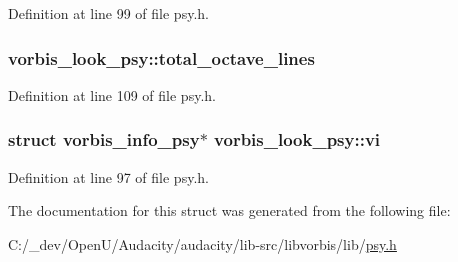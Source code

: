 Definition at line 99 of file psy.\+h.

\subsubsection[{\texorpdfstring{total\+\_\+octave\+\_\+lines}{total_octave_lines}}]{ vorbis\+\_\+look\+\_\+psy\+::total\+\_\+octave\+\_\+lines}\hypertarget{structvorbis__look__psy_adf9a21c963c42ef1ccc000ab4127af09}{}\label{structvorbis__look__psy_adf9a21c963c42ef1ccc000ab4127af09}


Definition at line 109 of file psy.\+h.

\subsubsection[{\texorpdfstring{vi}{vi}}]{\setlength{\rightskip}{0pt plus 5cm}struct {\bf vorbis\+\_\+info\+\_\+psy}$\ast$ vorbis\+\_\+look\+\_\+psy\+::vi}\hypertarget{structvorbis__look__psy_a7e8428a907f20c860e64ec33d45309d8}{}\label{structvorbis__look__psy_a7e8428a907f20c860e64ec33d45309d8}


Definition at line 97 of file psy.\+h.



The documentation for this struct was generated from the following file\+:\begin{DoxyCompactItemize}
\item 
C\+:/\+\_\+dev/\+Open\+U/\+Audacity/audacity/lib-\/src/libvorbis/lib/\hyperlink{psy_8h}{psy.\+h}\end{DoxyCompactItemize}
